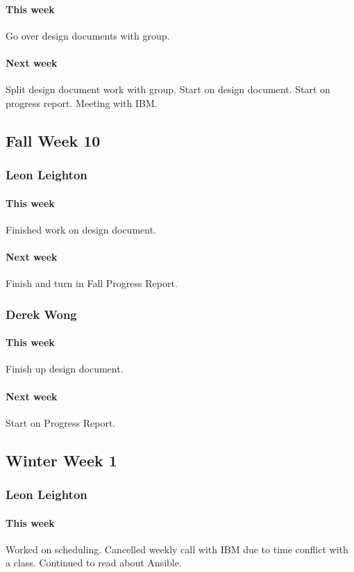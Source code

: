 \documentclass[10pt,letterpaper,onecolumn,draftclsnofoot]{IEEEtran}
\begin{document}
\paragraph{This week}Go over design documents with group.
\paragraph{Next week}Split design document work with group.                  
Start on design document.                
Start on progress report.             
Meeting with IBM.

\subsection{Fall Week 10}
\subsubsection{Leon Leighton}
\paragraph{This week}Finished work on design document.
\paragraph{Next week}Finish and turn in Fall Progress Report.

\subsubsection{Derek Wong}
\paragraph{This week}Finish up design document.
\paragraph{Next week}Start on Progress Report.

\subsection{Winter Week 1}
\subsubsection{Leon Leighton}
\paragraph{This week}Worked on scheduling. Cancelled weekly call with IBM due to time conflict with a class.  
Continued to read about Ansible.
\end{document}

